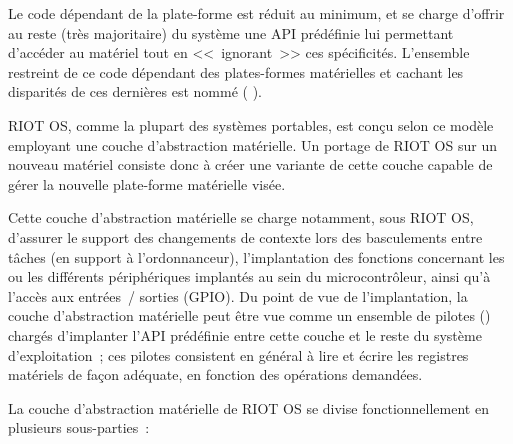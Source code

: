 Le code dépendant de la plate-forme est réduit au minimum, et se charge
d'offrir au reste (très majoritaire) du système une API prédéfinie
lui permettant d'accéder au matériel tout en <<~ignorant~>> ces
spécificités. L'ensemble restreint de ce code dépendant des plates-formes
matérielles et cachant les disparités de ces dernières est nommé
 ( ).

\smallskip

RIOT OS, comme la plupart des systèmes portables, est conçu selon ce modèle
employant une couche d'abstraction matérielle. Un portage de RIOT OS sur un
nouveau matériel consiste donc à créer une variante de cette couche capable
de gérer la nouvelle plate-forme matérielle visée.

Cette couche d'abstraction matérielle se charge notamment, sous RIOT OS,
d'assurer le support des changements de contexte lors des basculements entre
tâches (en support à l'ordonnanceur), l'implantation des fonctions concernant
les  ou les différents périphériques implantés au sein du
microcontrôleur, ainsi qu'à l'accès aux entrées~/ sorties (GPIO). Du point
de vue de l'implantation, la couche d'abstraction matérielle peut être vue
comme un ensemble de pilotes () chargés d'implanter l'API
prédéfinie entre cette couche et le reste du système d'exploitation~;
ces pilotes consistent en général à lire et écrire les registres matériels
de façon adéquate, en fonction des opérations demandées.

\smallskip

La couche d'abstraction matérielle de RIOT OS se divise fonctionnellement
en plusieurs sous-parties~:

